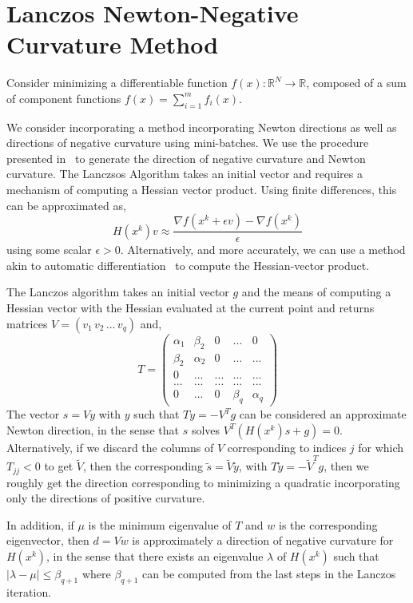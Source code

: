\documentclass[psamsfonts,onesided,10pt]{amsart}
\theoremstyle{definition}
\theoremstyle{remark}
\numberwithin{equation}{section}
\begin{document}
\section{Lanczos Newton-Negative Curvature Method}
Consider minimizing a differentiable function $f(x):\mathbb{R}^N\to \mathbb{R}$, composed of a sum of component functions $f(x) = \sum_{i=1}^m f_i(x)$.

We consider incorporating a method incorporating Newton directions as well as directions of negative curvature using mini-batches. We use the
procedure presented in~\cite{lucidi1998curvilinear} to generate the direction of negative curvature and Newton curvature. The Lanczsos Algorithm
takes an initial vector and requires a mechanism of computing a Hessian vector product. Using finite differences, this can be approximated as,
\[
H(x^k)v \approx \frac{\nabla f(x^k+\epsilon v)-\nabla f(x^k)}{\epsilon}
\] 
using some scalar $\epsilon>0$. Alternatively, and more accurately, we can use a method akin to automatic differentiation~\cite{pearlmutter1994fast}
to compute the Hessian-vector product. 

The Lanczos algorithm takes an initial vector $g$ and the means of computing a Hessian vector with the Hessian evaluated at the current point
and returns matrices $V=(v_1\,v_2\,...\,v_q)$ and,
\[
T=\begin{pmatrix} \alpha_1 & \beta_2 & 0 & ... & 0 \\ \beta_2 & \alpha_2 & 0 & ... & ... \\ 0 & ... & ... & ... & ... \\ ... & ... & ... & ... & ... \\ 0 & ... & 0 & \beta_q & \alpha_q \end{pmatrix}
\] 
The vector $s = V y$ with $y$ such that $Ty = -V^T g$ can be considered an approximate Newton direction, in the sense that $s$ solves
$V^T (H(x^k)s+g)=0$. Alternatively, if we discard the columns of $V$ corresponding to indices $j$ for which $T_{jj}<0$ to get $\tilde V$, then the 
corresponding $\tilde s = \tilde V \tilde y$,  with $T \tilde y = -\tilde V^T g$, then we roughly get the direction corresponding to minimizing a quadratic 
incorporating only the directions of positive curvature. 

In addition, if $\mu$ is the minimum eigenvalue of $T$ and $w$ is the corresponding eigenvector, then $d = Vw$ is approximately a direction
of negative curvature for $H(x^k)$, in the sense that there exists an eigenvalue $\lambda$ of $H(x^k)$ such that $|\lambda-\mu|\le \beta_{q+1}$
where $\beta_{q+1}$ can be computed from the last steps in the Lanczos iteration.
\end{document}
